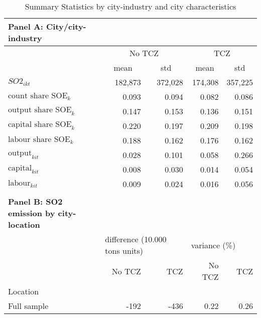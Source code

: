 \documentclass[12pt]{article}
\begin{document}
\begin{table}[!htbp] \centering
    \caption{ Summary Statistics by city-industry and city characteristics}
      \begin{adjustbox}{width=\textwidth, totalheight=\baselineskip,keepaspectratio}
    \label{tab:table2}
    \begin{tabular}{lrrrr}
      \multicolumn{1}{l}{\textbf{\small Panel A: City/city-industry}} \\
      \toprule
      & \multicolumn{2}{c}{No TCZ} & \multicolumn{2}{c}{TCZ} \\
      & \multicolumn{1}{c}{mean} & \multicolumn{1}{c}{std} & \multicolumn{1}{c}{mean} & \multicolumn{1}{c}{std}\\
      \midrule
      $SO2_{ikt}$                  & 182,873 & 372,028 & 174,308 & 357,225 \\
      $\text{count share SOE}_k$   & 0.093  & 0.094  & 0.082  & 0.086  \\
      $\text{output share SOE}_k$  & 0.147  & 0.153  & 0.136  & 0.151  \\
      $\text{capital share SOE}_k$ & 0.220  & 0.197  & 0.209  & 0.198  \\
      $\text{labour share SOE}_k$  & 0.188  & 0.162  & 0.176  & 0.162  \\
      $\text{output}_{kit}$        & 0.028  & 0.101  & 0.058  & 0.266  \\
      $\text{capital}_{kit}$       & 0.008  & 0.030  & 0.014  & 0.054  \\
      $\text{labour}_{kit}$        & 0.009  & 0.024  & 0.016  & 0.056  \\
      \bottomrule
      \\ %
      \multicolumn{1}{l}{\textbf{\small Panel B: SO2 emission by city-location}} \\
      \toprule
      {} & \multicolumn{2}{l}{\footnotesize difference (10.000 tons units)} & \multicolumn{2}{l}{variance (\footnotesize \%)} \\
                  & No TCZ   & TCZ      & No TCZ & TCZ  \\
      Location    &          &          &        &      \\
      \midrule
      Full sample &    -192 & -436 &     0.22 & 0.26 \\

\end{tabular}
\end{adjustbox}
\end{table}
\end{document}
